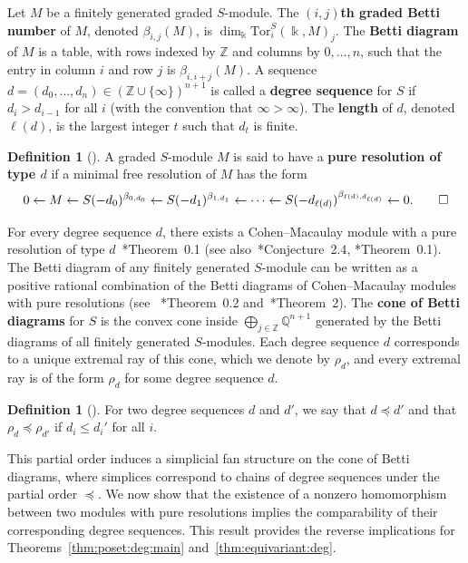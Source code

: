 \documentclass[12pt]{amsart}
\theoremstyle{definition}
\newtheorem{defn}[equation]{Definition}
\newenvironment{definition}[1][]{\begin{defn}[#1]\pushQED{\qed}}{\popQED \end{defn}}
\newcommand{\ZZ}{\mathbb{Z}}
\newcommand{\QQ}{\mathbb{Q}}
\newcommand{\defi}[1]{{\upshape\bfseries #1}}
\begin{document}
Let $M$ be a finitely generated graded $S$-module. 
The \defi{$(i,j)$th graded Betti number} of $M$, 
denoted $\beta_{i,j}(M)$, is $\dim_\Bbbk \mathrm{Tor}_i^S(\Bbbk, M)_j$. 
The \defi{Betti diagram} of $M$ is a table, with rows indexed by $\ZZ$ 
and columns by $0, \dots, n$, 
such that the entry in column $i$ and row $j$ is $\beta_{i,i+j}(M)$.
%
A sequence $d=(d_0, \dots, d_n)\in \left( \ZZ\cup \{\infty\} \right)^{n+1}$
is called a \defi{degree sequence} for $S$ if $d_i>d_{i-1}$ for all $i$ 
(with the convention that $\infty>\infty$). 
%
The \defi{length} of $d$, denoted $\ell(d)$, 
is the largest integer $t$ such that $d_t$ is finite. 


\begin{definition}\label{def:pure:res}
A graded $S$-module $M$ is said to have a \defi{pure resolution of type
$d$} if a
minimal free resolution of $M$ has the form
\[
0\leftarrow M \leftarrow S(-d_0)^{\beta_{0,d_0}} \leftarrow S(-d_1)^{\beta_{1,d_1}} \leftarrow
\dots
\leftarrow 
S(-d_{\ell(d)})^{\beta_{\ell(d),d_{\ell(d)}}} \leftarrow 0.
\qedhere
\]
\end{definition}

For every degree sequence $d$, there exists a 
Cohen--Macaulay module with a
pure resolution of type $d$~\cite{EiScConjOfBS07}*{Theorem~0.1} (see also~\cite{boij-sod1}*{Conjecture~2.4}, \cite{efw}*{Theorem~0.1}). 
The Betti diagram of any finitely generated $S$-module can be written as a positive
rational combination of the Betti diagrams of Cohen--Macaulay modules with
pure resolutions (see ~\cite {EiScConjOfBS07}*{Theorem~0.2} and~\cite{BoijSoderbergNonCM08}*{Theorem~2}). 
The \defi{cone of Betti diagrams} for $S$ 
is the convex cone inside $\bigoplus_{j \in \ZZ}\QQ^{n+1}$ 
generated by the Betti diagrams of all finitely generated $S$-modules.
Each degree sequence $d$ corresponds to a unique extremal ray of this cone, 
which we denote by $\rho_d$, and  
every extremal ray is of the form $\rho_d$ for some degree sequence $d$.


\begin{definition}\label{defn:partial:deg}
For two degree sequences $d$ and $d'$, we say that $d\preceq d'$  and that
$\rho_d\preceq \rho_{d'}$ if $d_i\leq d_i'$ for all $i$. 
\end{definition}
%
This partial order induces a simplicial fan structure on the cone of Betti diagrams, 
where simplices correspond to chains of degree sequences under the partial
order $\preceq$.
%
We now show that the existence of a nonzero homomorphism between 
two modules with pure resolutions implies the comparability of their 
corresponding degree sequences. 
This result provides the reverse implications for 
Theorems~\ref{thm:poset:deg:main} and~\ref{thm:equivariant:deg}. 
\end{document}

